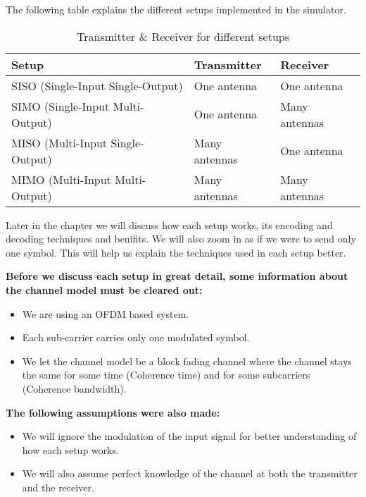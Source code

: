 The following table explains the different setups implemented in the simulator.
\begin{table}[!ht]
    \centering
    \caption{Transmitter \& Receiver for different setups}
    \label{tbl:mytable}
    \begin{tabular}{lll}
        \toprule
        Setup & Transmitter & Receiver \\
        \midrule
        SISO (Single-Input Single-Output)  & One antenna   & One antenna   \\
        SIMO (Single-Input Multi-Output)   & One antenna   & Many antennas \\
        MISO (Multi-Input Single-Output)   & Many antennas & One antenna   \\
        MIMO (Multi-Input Multi-Output)    & Many antennas & Many antennas \\
        \bottomrule
    \end{tabular}
\end{table}

Later in the chapter we will discuss how each setup works, its encoding and decoding techniques and benifits. We will also zoom in as if we were to send only one symbol. This will help us explain the techniques used in each setup better.

\begin{GrayBox}
    \textbf{Before we discuss each setup in great detail, some information about the channel model must be cleared out:}
    \begin{itemize}
        \item We are using an OFDM based system.
        \item Each sub-carrier carries only one modulated symbol.
        \item We let the channel model be a block fading channel where the channel stays the same for some time (Coherence time) and for some subcarriers (Coherence bandwidth).
    \end{itemize}

    \textbf{The following assumptions were also made:}
    \begin{itemize}
        \item We will ignore the modulation of the input signal for better understanding of how each setup works.
        \item We will also assume perfect knowledge of the channel at both the transmitter and the receiver.
    \end{itemize}
\end{GrayBox}

